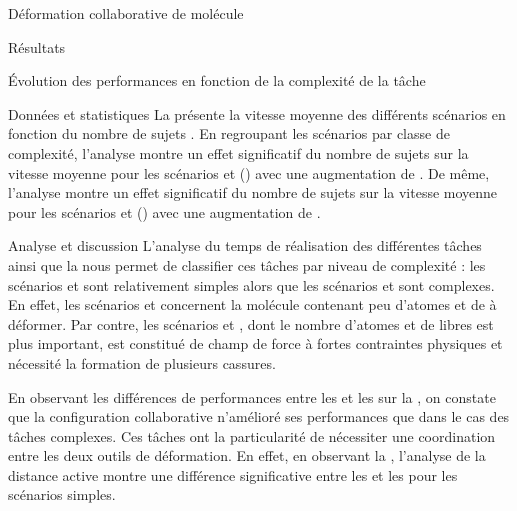 \documentclass[myfrancais,ngerman,english,french]{mythesis}
\begin{document}
\begin{mychapter}{Déformation collaborative de molécule}
\begin{mysection}{Résultats}
\begin{mysubsection}{Évolution des performances en fonction de la complexité de la tâche}
\begin{mysubsubsection}{Données et statistiques}
					La  présente la vitesse moyenne  des différents scénarios  en fonction du nombre de sujets .
					En regroupant les scénarios par classe de complexité, l'analyse montre un effet significatif du nombre de sujets  sur la vitesse moyenne  pour les scénarios  et  () avec une augmentation de .
					De même, l'analyse montre un effet significatif du nombre de sujets  sur la vitesse moyenne  pour les scénarios  et  () avec une augmentation de .
				\end{mysubsubsection}
				\begin{mysubsubsection}{Analyse et discussion}
					L'analyse du temps de réalisation des différentes tâches ainsi que la  nous permet de classifier ces tâches par niveau de complexité : les scénarios  et  sont relativement simples alors que les scénarios  et  sont complexes.
					En effet, les scénarios  et  concernent la molécule \myTRPZIPPER contenant peu d'atomes et de  à déformer.
					Par contre, les scénarios  et , dont le nombre d'atomes et de  libres est plus important, est constitué de champ de force à fortes contraintes physiques et nécessité la formation de plusieurs cassures.

					En observant les différences de performances entre les  et les  sur la , on constate que la configuration collaborative n'amélioré ses performances que dans le cas des tâches complexes.
					Ces tâches ont la particularité de nécessiter une coordination entre les deux outils de déformation.
					En effet, en observant la , l'analyse de la distance active montre une différence significative entre les  et les  pour les scénarios simples.


\end{mysubsubsection}
\end{mysubsection}
\end{mysection}
\end{mychapter}
\end{document}
